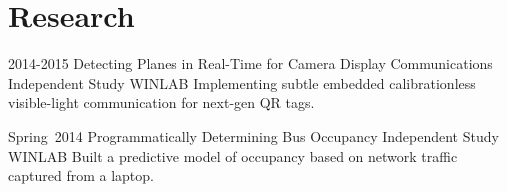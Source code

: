 \documentclass[11pt,letterpaper]{moderncv}
\begin{document}
\section{Research}
    \cventry
        {2014-2015}
        {Detecting Planes in Real-Time for Camera Display Communications}
        {\break Independent Study}
        {}
        {WINLAB}
        {Implementing subtle embedded calibrationless visible-light communication for next-gen QR tags.\\}

    \cventry
        {Spring~2014}
        {Programmatically Determining Bus Occupancy}
        {Independent Study}
        {}
        {WINLAB}
        {Built a predictive model of occupancy based on network traffic captured from a laptop.\\}


\end{document}
